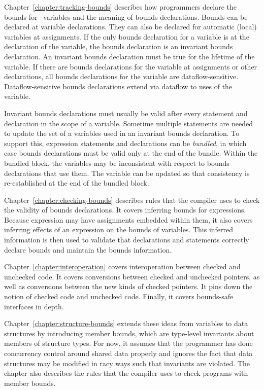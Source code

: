 Chapter~\ref{chapter:tracking-bounds} describes how programmers declare the bounds for
\arrayptr\ variables and the meaning of bounds declarations.
Bounds can be declared at variable declarations. They can also be
declared for automatic (local) variables at assignments. If the only
bounds declaration for a variable is at the declaration of the variable,
the bounds declaration is an invariant bounds declaration. An invariant
bounds declaration must be true for the lifetime of the variable. If
there are bounds declarations for the variable at assignments or other
declarations, all bounds declarations for the variable are
dataflow-sensitive. Dataflow-sensitive bounds declarations extend via
dataflow to uses of the variable.

Invariant bounds declarations must usually be valid after every
statement and declaration in the scope of a variable. Sometime multiple
statements are needed to update the set of a variables used in an
invariant bounds declaration. To support this, expression statements and
declarations can be \emph{bundled}, in which case bounds declarations
must be valid only at the end of the bundle. Within the bundled block,
the variables may be inconsistent with respect to bounds declarations
that use them. The variable can be updated so that consistency is
re-established at the end of the bundled block.

Chapter~\ref{chapter:checking-bounds} describes rules that the compiler uses to check the validity
of bounds declarations. It covers inferring bounds for expressions.
Because expression may have assignments embedded within them, it also
covers inferring effects of an expression on the bounds of variables.
This inferred information is then used to validate that declarations and
statements correctly declare bounds and maintain the bounds information.

Chapter~\ref{chapter:interoperation} covers interoperation between 
checked and unchecked code. It covers conversions between checked and
unchecked pointers, as well as conversions between the new kinds of checked pointers.
It pins down the notion of checked code  and unchecked code. Finally, it covers
bounds-safe interfaces in depth.

Chapter~\ref{chapter:structure-bounds} extends these ideas from variables to data 
structures by
introducing member bounds, which are type-level invariants about members
of structure types. For now, it assumes that the programmer has done
concurrency control around shared data properly and ignores the fact
that data structures may be modified in racy ways such that invariants
are violated.  The chapter also describes the rules that the compiler
uses to check programs with member bounds.

